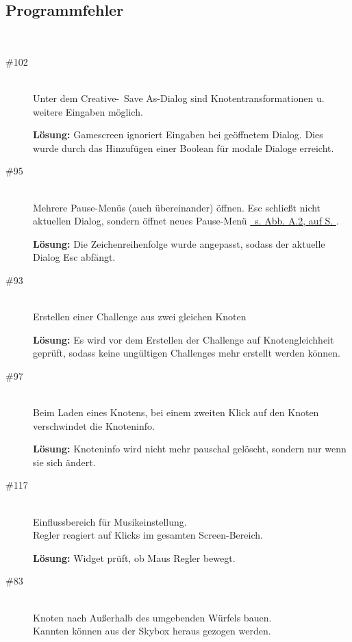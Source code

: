 %



\subsection*{Programmfehler}


~\\
\begin{description}

\item[\#102] \hfill \\
Unter dem Creative-\glqq~Save As\grqq-Dialog sind Knotentransformationen u. weitere Eingaben möglich.

{\bfseries Lösung:} Gamescreen ignoriert Eingaben bei geöffnetem Dialog. Dies wurde durch das Hinzufügen einer Boolean für modale Dialoge erreicht. 


\item[\#95] \hfill \\
Mehrere Pause-Menüs (auch übereinander) öffnen.
Esc schließt nicht aktuellen Dialog, sondern öffnet neues Pause-Menü \hyperref[Anhang:Grafikfehler:Dialog_Pause]{\mousecursor~s. Abb. A.2, auf S. \pageref{Anhang:Grafikfehler:Dialog_Pause}}.

{\bfseries Lösung:} Die Zeichenreihenfolge wurde angepasst, sodass der aktuelle Dialog Esc abfängt.


\item[\#93] \hfill \\
Erstellen einer Challenge aus zwei gleichen Knoten

{\bfseries Lösung:}  Es wird vor dem Erstellen der Challenge auf Knotengleichheit geprüft, sodass keine ungültigen Challenges mehr erstellt werden können.


\item[\#97] \hfill \\
Beim Laden eines Knotens, bei einem zweiten Klick auf den Knoten verschwindet die Knoteninfo.

{\bfseries Lösung:} Knoteninfo wird nicht mehr pauschal gelöscht, sondern nur wenn sie sich ändert. 


\item[\#117] \hfill \\
Einflussbereich für Musikeinstellung. \\
Regler reagiert auf Klicks im gesamten Screen-Bereich.

{\bfseries Lösung:} Widget prüft, ob Maus Regler bewegt.


\item[\#83] \hfill \\
Knoten nach Außerhalb des umgebenden Würfels bauen. \\
Kannten können aus der Skybox heraus gezogen werden.


\end{description}
